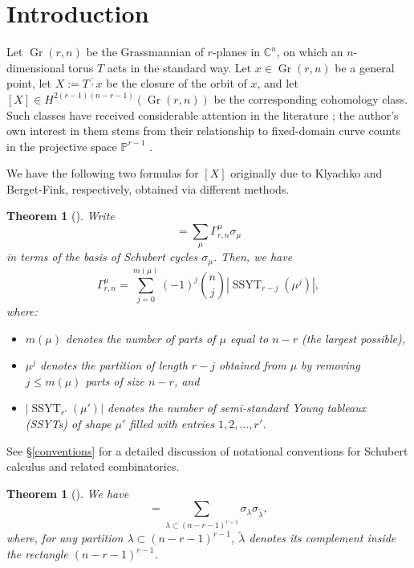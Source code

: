 \documentclass[11pt]{article}
\newtheorem{thm}[theo]{Theorem}
\theoremstyle{definition}
\numberwithin{equation}{section}
\newcommand{\bC}{\mathbb{C}}
\newcommand{\bP}{\mathbb{P}}
\DeclareMathOperator{\Gr}{Gr}
\DeclareMathOperator{\ssyt}{SSYT}
\begin{document}
\section{Introduction}

Let $\Gr(r,n)$ be the Grassmannian of $r$-planes in $\bC^n$, on which an $n$-dimensional torus $T$ acts in the standard way. Let $x\in \Gr(r,n)$ be a general point, let $X:=\overline{T\cdot x}$ be the closure of the orbit of $x$, and let $[X]\in H^{2(r-1)(n-r-1)}(\Gr(r,n))$ be the corresponding cohomology class. Such classes have received considerable attention in the literature \cite{K85,Spe09,BF17,LPST20,NT23}; the author's own interest in them stems from their relationship to fixed-domain curve counts in the projective space $\bP^{r-1}$ \cite{L23}.


We have the following two formulas for $[X]$ originally due to Klyachko and Berget-Fink, respectively, obtained via different methods.

\begin{thm}[{\cite[Theorem 6]{K85}}]\label{k_formula}
Write
\begin{equation*}
[X]=\sum_{\mu} \Gamma^\mu_{r,n}\sigma_{\mu}
\end{equation*}
in terms of the basis of Schubert cycles $\sigma_\mu$. Then, we have
\begin{equation*}
\Gamma^\mu_{r,n}=\sum_{j=0}^{m(\mu)}(-1)^j\binom{n}{j}|\ssyt_{r-j}(\mu^j)|,
\end{equation*}
where:
\begin{itemize}
\item $m(\mu)$ denotes the number of parts of $\mu$ equal to $n-r$ (the largest possible), 
\item $\mu^j$ denotes the partition of length $r-j$ obtained from $\mu$ by removing $j\le m(\mu)$ parts of size $n-r$, and
\item $|\ssyt_{r'}(\mu')|$ denotes the number of semi-standard Young tableaux (SSYTs) of shape $\mu'$ filled with entries $1,2,\ldots,r'$.
\end{itemize}
\end{thm}

See \S\ref{conventions} for a detailed discussion of notational conventions for Schubert calculus and related combinatorics.

\begin{thm}[{\cite[Theorem 5.1]{BF17}}]\label{bf_formula}
We have
\begin{equation*}
[X]=\sum_{\lambda\subset(n-r-1)^{r-1}}\sigma_{\lambda}\sigma_{\widetilde{\lambda}},
\end{equation*}
where, for any partition $\lambda\subset(n-r-1)^{r-1}$, $\widetilde{\lambda}$ denotes its complement inside the rectangle $(n-r-1)^{r-1}$.
\end{thm}
\end{document}
